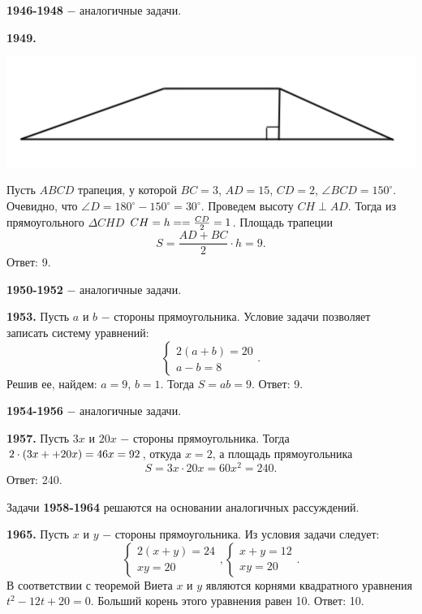 \textbf{1946-1948} $-$ аналогичные задачи.

\textbf{1949.}

{\centering \includegraphics[width=0.6\linewidth]{Geometry/Content/30.png}
	
}

Пусть $ABCD$ трапеция, у которой $BC = 3$, $AD = 15$, $CD = 2$, $\angle BCD = 150^\circ$. Очевидно, что $\angle D = 180^\circ - 150^\circ = 30^\circ$. Проведем высоту $CH \perp AD$. Тогда из прямоугольного $\Delta CHD$ $CH = h= \linebreak = \frac{CD}{2} = 1$. Площадь трапеции
\[
S = \frac{AD+BC}{2}\cdot h = 9.
\] \null \hspace*{\fill} Ответ: 9.

\textbf{1950-1952} $-$ аналогичные задачи.

\textbf{1953.} Пусть $a$ и $b$ $-$ стороны прямоугольника. Условие задачи позволяет записать систему уравнений:
\[
\begin{cases}
	2(a+b)=20 \\
	a-b=8
\end{cases}.
\]
Решив ее, найдем: $a =9$, $b = 1$. Тогда $S = ab = 9.$ \newline \null \hspace*{\fill} Ответ: 9.

\textbf{1954-1956} $-$ аналогичные задачи.

\textbf{1957.} Пусть $3x$ и $20x$ $-$ стороны прямоугольника. Тогда $2\cdot(3x+\linebreak+20x)=46x=92$, откуда $x =2$, а площадь прямоугольника
\[
S = 3x\cdot20x=60x^2=240.
\]
\null \hspace*{\fill} Ответ: 240.

Задачи \textbf{1958-1964} решаются на основании аналогичных рассуждений.

\textbf{1965.} Пусть $x$ и $y$ $-$ стороны прямоугольника. Из условия задачи следует:
\[
\begin{cases} 
	2(x+y)=24\\
	xy=20
\end{cases},
\begin{cases}
	x+y=12\\
	xy=20
\end{cases}.
\]
В соответствии с теоремой Виета $x$ и $y$ являются корнями квадратного уравнения $t^2-12t+20=0$. Больший корень этого уравнения равен 10. \newline \null \hspace*{\fill} Ответ: 10.

